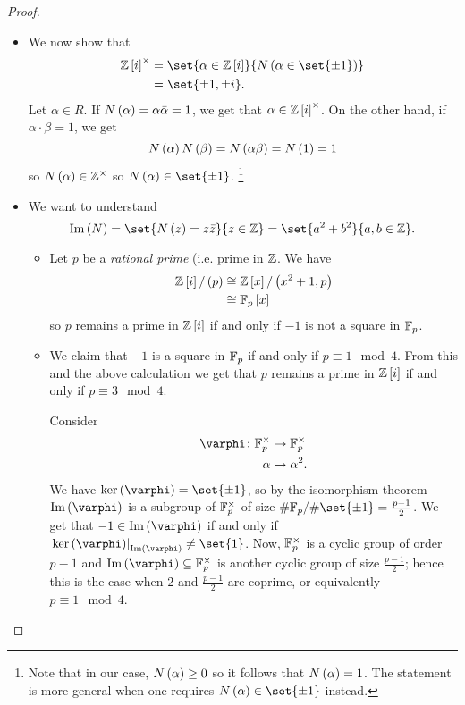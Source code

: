 \documentclass[11pt]{karticle}
\begin{document}
\begin{proof}
\begin{itemize}
\item
We now show that
\begin{align*}
\mbb{Z}\brs{i}^\times &= \set{\alpha \in \mbb{Z}\brs{i}}{N\prs{\alpha \in \set{\pm 1}}}
\\&= \set{\pm 1, \pm i} \text{.}
\end{align*}
Let $\alpha \in R$. If $N\left( \alpha \right) = \alpha \bar{\alpha} = 1$, we get that $\alpha \in \mathbb{Z}\left[ i \right]^\times$. On the other hand, if $\alpha \cdot \beta = 1$, we get \[N\left( \alpha \right) N\left( \beta \right) = N\left( \alpha \beta \right) = N\left( 1 \right) = 1\]
so $N\left( \alpha \right) \in \mathbb{Z}^\times$ so $N\prs{\alpha} \in \set{\pm 1}$. \footnote{Note that in our case, $N\left( \alpha \right) \geq 0$ so it follows that $N\left( \alpha \right) = 1$. The statement is more general when one requires $N\prs{\alpha} \in \set{\pm 1}$ instead.}

\item We want to understand
\[\im\prs{N} = \set{N\prs{z} = z \bar{z}}{z \in \mbb{Z}} = \set{a^2 + b^2}{a,b \in \mbb{Z}} \text{.}\]

\begin{itemize}
\item Let $p$ be a \emph{rational prime} (i.e. prime in $\mathbb{Z}$. 
We have
\begin{align*}
\mathbb{Z}\left[ i \right] / \left( p \right) &\cong \mathbb{Z}\left[ x \right] / \left( x^2 + 1, p \right)
\\&\cong \mathbb{F}_p\left[ x \right]
\end{align*}
so $p$ remains a prime in $\mathbb{Z}\left[ i \right]$ if and only if $-1$ is not a square in $\mathbb{F}_p$.

\item We claim that $-1$ is a square in $\mathbb{F}_p$ if and only if $p \equiv 1 \mod{4}$. From this and the above calculation we get that $p$ remains a prime in $\mathbb{Z}\left[ i \right]$ if and only if $p \equiv 3 \mod{4}$.

Consider
\begin{align*}
\varphi \colon \mbb{F}_p^\times &\to \mbb{F}_p^\times \\
\alpha &\mapsto \alpha^2 \text{.}
\end{align*}
We have $\ker\prs{\varphi} = \set{\pm 1}$, so by the isomorphism theorem $\im\prs{\varphi}$ is a subgroup of $\mathbb{F}_p^\times$ of size $\#\mbb{F}_p / \#\set{\pm 1} = \frac{p-1}{2}$.
We get that $-1 \in \im\prs{\varphi}$ if and only if $\left. \ker\prs{\varphi} \right|_{\im\prs{\varphi}} \neq \set{1}$.
Now, $\mathbb{F}_p^\times$ is a cyclic group of order $p-1$ and $\im\prs{\varphi} \subseteq \mbb{F}_p^\times$ is another cyclic group of size $\frac{p-1}{2}$; hence this is the case when $2$ and $\frac{p-1}{2}$ are coprime, or equivalently $p \equiv 1 \mod{4}$.


\end{itemize}
\end{itemize}
\end{proof}
\end{document}
